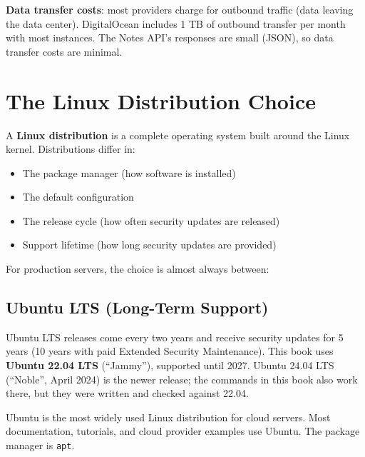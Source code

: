 \textbf{Data transfer costs}: most providers charge for outbound traffic (data leaving the data center). DigitalOcean includes 1 TB of outbound transfer per month with most instances. The Notes API's responses are small (JSON), so data transfer costs are minimal.

\setcounter{section}{4}
\section{The Linux Distribution Choice}\label{20-server-fundamentals:205-the-linux-distribution-choice}

A \textbf{Linux distribution} is a complete operating system built around the Linux kernel. Distributions differ in:

\begin{itemize}
\tightlist
\item
  The package manager (how software is installed)
\item
  The default configuration
\item
  The release cycle (how often security updates are released)
\item
  Support lifetime (how long security updates are provided)
\end{itemize}

\noindent{}For production servers, the choice is almost always between:

\subsection*{Ubuntu LTS (Long-Term Support)}\label{20-server-fundamentals:ubuntu-lts-long-term-support}

Ubuntu LTS releases come every two years and receive security updates for 5 years (10 years with paid Extended Security Maintenance). This book uses \textbf{Ubuntu 22.04 LTS} (``Jammy''), supported until 2027. Ubuntu 24.04 LTS (``Noble'', April 2024) is the newer release; the commands in this book also work there, but they were written and checked against 22.04.

Ubuntu is the most widely used Linux distribution for cloud servers. Most documentation, tutorials, and cloud provider examples use Ubuntu. The package manager is \texttt{apt}.

\begin{codebox}[short]

\begin{Shaded}
\begin{Highlighting}[]
\KeywordTok{\&\&} 

\end{Highlighting}
\end{Shaded}

\end{codebox}

